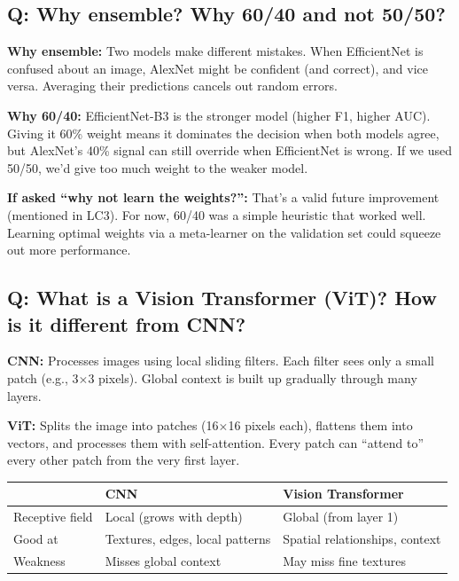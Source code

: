 \documentclass[11pt]{article}
\begin{document}
\subsection{Q: Why ensemble? Why 60/40 and not 50/50?}

\textbf{Why ensemble:}
Two models make different mistakes. When EfficientNet is confused about an image, AlexNet might be confident (and correct), and vice versa. Averaging their predictions cancels out random errors.

\textbf{Why 60/40:}
EfficientNet-B3 is the stronger model (higher F1, higher AUC). Giving it 60\% weight means it dominates the decision when both models agree, but AlexNet's 40\% signal can still override when EfficientNet is wrong. If we used 50/50, we'd give too much weight to the weaker model.

\textbf{If asked ``why not learn the weights?'':} That's a valid future improvement (mentioned in LC3). For now, 60/40 was a simple heuristic that worked well. Learning optimal weights via a meta-learner on the validation set could squeeze out more performance.

\subsection{Q: What is a Vision Transformer (ViT)? How is it different from CNN?}

\textbf{CNN:} Processes images using local sliding filters. Each filter sees only a small patch (e.g., 3$\times$3 pixels). Global context is built up gradually through many layers.

\textbf{ViT:} Splits the image into patches (16$\times$16 pixels each), flattens them into vectors, and processes them with self-attention. Every patch can ``attend to'' every other patch from the very first layer.

\begin{table}[H]
    \centering
    \renewcommand{\arraystretch}{1.3}
    \begin{tabular}{lll}
        \toprule
        & \textbf{CNN} & \textbf{Vision Transformer} \\
        \midrule
        Receptive field & Local (grows with depth) & Global (from layer 1) \\
        Good at & Textures, edges, local patterns & Spatial relationships, context \\
        Weakness & Misses global context & May miss fine textures \\
        \bottomrule
    \end{tabular}
\end{table}
\end{document}
